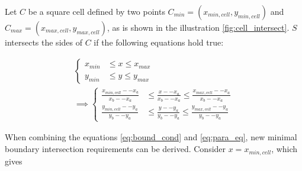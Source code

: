 \documentclass[
	a4paper,
	12pt,
	raggedright,
	twoside
]{tufte-style-article}
\theoremstyle{definition}
\theoremstyle{remark}
\begin{document}
Let $C$ be a square cell defined by two points $C_{min} = (x_{min, cell}, y_{min, cell})$ and $C_{max} = (x_{max, cell}, y_{max, cell})$, as is shown in the illustration \ref{fig:cell_intersect}. $S$ intersects the sides of $C$ if the following equations hold true:

\begin{align}
\begin{cases}
    x_{min} &\leq x \leq x_{max} \\
    y_{min} &\leq y \leq y_{max}
\end{cases}
\\
\implies
\begin{cases}\label{eq:bound_cond}
    \frac{x_{min, cell} -- x_a}{x_b -- x_a} &\leq \frac{x -- x_a}{x_b -- x_a} \leq \frac{x_{max, cell} -- x_a}{x_b -- x_a} \\
    \frac{y_{min, cell} -- y_a}{y_b -- y_a} &\leq \frac{y -- y_a}{y_b -- y_a} \leq \frac{y_{max, cell} -- y_a}{y_b -- y_a}
\end{cases}
\end{align}

When combining the equations \ref{eq:bound_cond} and \ref{eq:para_eq}, new minimal boundary intersection requirements can be derived.
Consider $x = x_{min, cell}$, which gives
\end{document}
